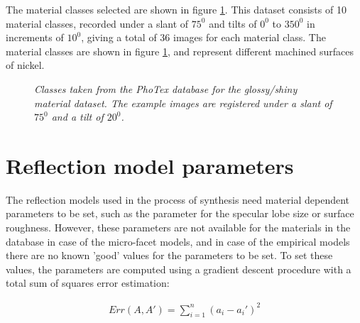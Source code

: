 The material classes selected are shown in figure \ref{fig:PhoTexData2}. This dataset consists of 10 material classes, recorded under a slant of $75^0$ and tilts of $0^0$ to $350^0$ in increments of $10^0$, giving a total of 36 images for each material class. The material classes are shown in figure \ref{fig:PhoTexData2}, and represent different machined surfaces of nickel.

\begin{figure}[h]
	\begin{center}

	\end{center}
	\caption{{\it Classes taken from the PhoTex database for the glossy/shiny material dataset. The example images are registered under a slant of $75^0$ and a tilt of $20^0$.}}
	\label{fig:PhoTexData2}
\end{figure}

\section{Reflection model parameters}\label{sec:ParameterSetting}
The reflection models used in the process of synthesis need material dependent parameters to be set, such as the parameter for the specular lobe size or surface roughness. However, these parameters are not available for the materials in the database in case of the micro-facet models, and in case of the empirical models there are no known 'good' values for the parameters to be set. To set these values, the parameters are computed using a gradient descent procedure with a total sum of squares error estimation:

		\begin{eqnarray*}
			Err(A,A') = \sum_{i=1}^n (a_i - a_i')^2
		\end{eqnarray*}
 
